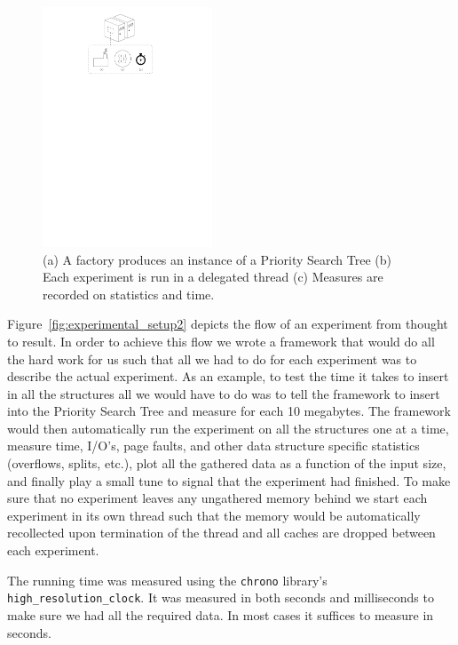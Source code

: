 \documentclass[twoside,11pt,openright]{report}
\begin{document}
\begin{figure}
\captionsetup{width=0.45\textwidth}
	\centering
		\includegraphics[width=0.45\textwidth]{../figures/experimental_setup_4}
	\caption{(a) A factory produces an instance of a Priority Search Tree (b) Each experiment is run in a delegated thread (c) Measures are recorded on statistics and time.}
	\label{fig:missing}
\end{figure}

Figure~\ref{fig:experimental_setup2} depicts the flow of an experiment from thought to result. In order to achieve this flow we wrote a framework that would do all the hard work for us such that all we had to do for each experiment was to describe the actual experiment. As an example, to test the time it takes to insert in all the structures all we would have to do was to tell the framework to insert into the Priority Search Tree and measure for each 10 megabytes. The framework would then automatically run the experiment on all the structures one at a time, measure time, I/O's, page faults, and other data structure specific statistics (overflows, splits, etc.), plot all the gathered data as a function of the input size, and finally play a small tune to signal that the experiment had finished. To make sure that no experiment leaves any ungathered memory behind we start each experiment in its own thread such that the memory would be automatically recollected upon termination of the thread and all caches are dropped between each experiment.

The running time was measured using the \texttt{chrono} library's \texttt{high\_resolution\_clock}. It was measured in both seconds and milliseconds to make sure we had all the required data. In most cases it suffices to measure in seconds.
\end{document}
